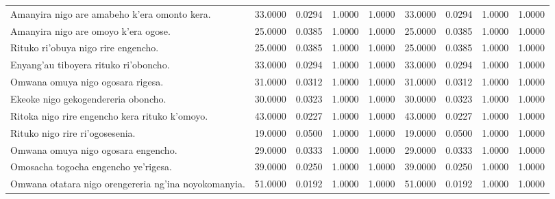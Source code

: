 \begin{table}
\begin{tabular}{lrrrrrrrr}
        Amanyira nigo are amabeho k'era omonto kera.         & 33.0000                                 & 0.0294                                  & 1.0000 & 1.0000 & 33.0000   & 0.0294   & 1.0000 & 1.0000 \\
        Amanyira nigo are omoyo k'era ogose.                 & 25.0000                                 & 0.0385                                  & 1.0000 & 1.0000 & 25.0000   & 0.0385   & 1.0000 & 1.0000 \\
        Rituko ri'obuya nigo rire engencho.                  & 25.0000                                 & 0.0385                                  & 1.0000 & 1.0000 & 25.0000   & 0.0385   & 1.0000 & 1.0000 \\
        Enyang’au tiboyera rituko ri’oboncho.                & 33.0000                                 & 0.0294                                  & 1.0000 & 1.0000 & 33.0000   & 0.0294   & 1.0000 & 1.0000 \\
        Omwana omuya nigo ogosara rigesa.                    & 31.0000                                 & 0.0312                                  & 1.0000 & 1.0000 & 31.0000   & 0.0312   & 1.0000 & 1.0000 \\
        Ekeoke nigo gekogendereria oboncho.                  & 30.0000                                 & 0.0323                                  & 1.0000 & 1.0000 & 30.0000   & 0.0323   & 1.0000 & 1.0000 \\
        Ritoka nigo rire engencho kera rituko k'omoyo.       & 43.0000                                 & 0.0227                                  & 1.0000 & 1.0000 & 43.0000   & 0.0227   & 1.0000 & 1.0000 \\
        Rituko nigo rire ri’ogosesenia.                      & 19.0000                                 & 0.0500                                  & 1.0000 & 1.0000 & 19.0000   & 0.0500   & 1.0000 & 1.0000 \\
        Omwana omuya nigo ogosara engencho.                  & 29.0000                                 & 0.0333                                  & 1.0000 & 1.0000 & 29.0000   & 0.0333   & 1.0000 & 1.0000 \\
        Omosacha togocha engencho ye'rigesa.                 & 39.0000                                 & 0.0250                                  & 1.0000 & 1.0000 & 39.0000   & 0.0250   & 1.0000 & 1.0000 \\
        Omwana otatara nigo orengereria ng'ina noyokomanyia. & 51.0000                                 & 0.0192                                  & 1.0000 & 1.0000 & 51.0000   & 0.0192   & 1.0000 & 1.0000 \\

\end{tabular}
\end{table}
